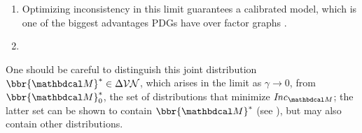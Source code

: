 \documentclass[twoside]{article}
\begin{document}

\begin{enumerate}[nosep]
\item 
        Optimizing inconsistency in this limit guarantees a calibrated model, which is one of the biggest advantages PDGs have over factor graphs
         \parencite[Example 5]{pdg-aaai}.
        
    \item 
\end{enumerate}

One should be careful to distinguish this joint distribution $\bbr{\dg M}^* \in \Delta\V \N$, which arises in the limit as $\gamma \to 0$, from $\bbr{\dg M}^*_0$, the set of distributions that minimize 
$\Inc_{\dg M}$; the latter set can be shown to contain $\bbr{\dg
  M}^*$ (see \cite{pdg-aaai}), but may also contain other distributions.
\end{document}
